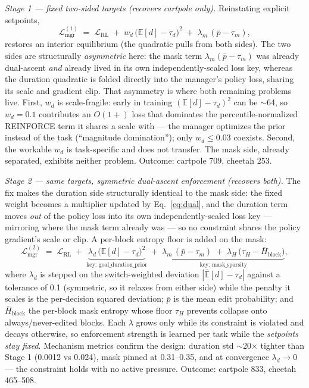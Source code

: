 \documentclass[10pt]{article}
\begin{document}
\emph{Stage 1 --- fixed two-sided targets (recovers cartpole only).}
Reinstating explicit setpoints,
\begin{equation}
\mathcal{L}^{(1)}_{\text{mgr}} \;=\; \mathcal{L}_{\text{RL}}
\;+\; w_d\,\big(\mathbb{E}[d] - \tau_d\big)^2
\;+\; \lambda_m\,(\bar p - \tau_m),
\label{eq:stage1}
\end{equation}
restores an interior equilibrium (the quadratic pulls from both sides). The
two sides are structurally \emph{asymmetric} here: the mask term
$\lambda_m(\bar p - \tau_m)$ was already dual-ascent \emph{and} already
lived in its own independently-scaled loss key, whereas the duration
quadratic is folded directly into the manager's policy loss, sharing its
scale and gradient clip. That asymmetry is where both remaining problems
live. First, $w_d$ is scale-fragile: early in training
$(\mathbb{E}[d]-\tau_d)^2$ can be $\sim$64, so $w_d{=}0.1$ contributes an
$O(1{+})$ loss that dominates the percentile-normalized REINFORCE term it
shares a scale with --- the manager optimizes the prior instead of the task
(``magnitude domination''); only $w_d \le 0.03$ coexists. Second, the
workable $w_d$ is task-specific and does not transfer. The mask side,
already separated, exhibits neither problem. Outcome: cartpole 709,
cheetah 253.

\emph{Stage 2 --- same targets, symmetric dual-ascent enforcement (recovers
both).} The fix makes the duration side structurally identical to the mask
side: the fixed weight becomes a multiplier updated by Eq.~\eqref{eq:dual},
and the duration term moves \emph{out} of the policy loss into its own
independently-scaled loss key --- mirroring where the mask term already
was --- so no constraint shares the policy gradient's scale or clip. A
per-block entropy floor is added on the mask:
\begin{equation}
\mathcal{L}^{(2)}_{\text{mgr}} \;=\; \mathcal{L}_{\text{RL}}
\;+\; \underbrace{\lambda_d \,\big(\mathbb{E}[d] - \tau_d\big)^2}_{\text{key: goal\_duration\_prior}}
\;+\; \underbrace{\lambda_m\,(\bar p - \tau_m)
\;+\; \lambda_H\,\big(\tau_H - \bar H_{\text{block}}\big)}_{\text{key: mask\_sparsity}},
\label{eq:stage2}
\end{equation}
where $\lambda_d$ is stepped on the switch-weighted deviation
$|\bar{\mathbb{E}}[d] - \tau_d|$ against a tolerance of 0.1 (symmetric, so it
relaxes from either side) while the penalty it scales is the per-decision
squared deviation; $\bar p$ is the mean edit probability; and
$\bar H_{\text{block}}$ the per-block mask entropy whose floor $\tau_H$
prevents collapse onto always/never-edited blocks. Each $\lambda$ grows only while its constraint is violated and
decays otherwise, so enforcement strength is learned per task while the
\emph{setpoints stay fixed}. Mechanism metrics confirm the design: duration
std $\sim$20$\times$ tighter than Stage 1 (0.0012 vs 0.024), mask pinned at
0.31--0.35, and at convergence $\lambda_d \to 0$ --- the constraint holds
with no active pressure. Outcome: cartpole 833, cheetah 465--508.
\end{document}
